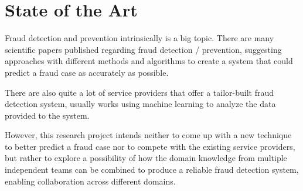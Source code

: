\section{State of the Art}

  Fraud detection and prevention intrinsically is a big topic. There are many scientific papers published regarding fraud detection / prevention, suggesting approaches with different methods and algorithms to create a system that could predict a fraud case as accurately as possible. 

  There are also quite a lot of service providers that offer a tailor-built fraud detection system, usually works using machine learning to analyze the data provided to the system. 
  
  However, this research project intends neither to come up with a new technique to better predict a fraud case nor to compete with the existing service providers, but rather to explore a possibility of how the domain knowledge from multiple independent teams can be combined to produce a reliable fraud detection system, enabling collaboration across different domains.

